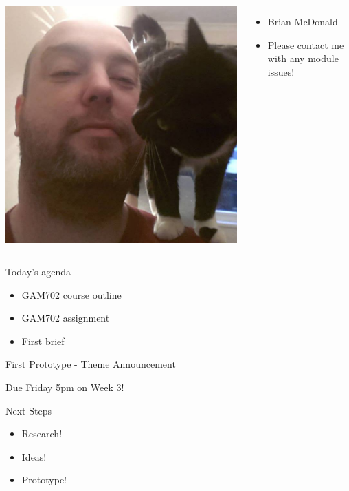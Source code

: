 \begin{frame}
	\begin{columns}
		\includegraphics[width=1.0\textwidth]{brian_mcdonald}
		\begin{itemize}
			\item Brian McDonald
			\item Please contact me with any module issues!
		\end{itemize}
	\end{columns}
\end{frame}

\begin{frame}{Today's agenda}
	\begin{itemize}
		\item GAM702 course outline
		\item GAM702 assignment
		\item First brief
	\end{itemize}
\end{frame}




\begin{frame}{First Prototype - Theme Announcement}
	\begin{center}
		\Huge{Due Friday 5pm on Week 3!}
	\end{center}
\end{frame}

\begin{frame}{Next Steps}
	\begin{itemize}
		\item Research!
		\item Ideas!
		\item Prototype!
	\end{itemize}
\end{frame}

